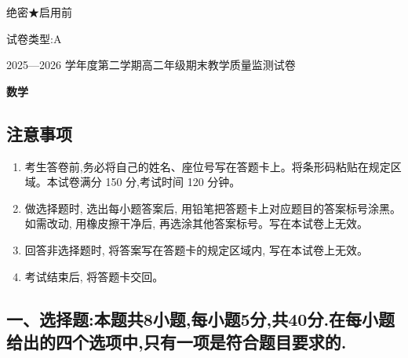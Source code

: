 \documentclass[UTF8,11pt,a4paper]{ctexart}
\newcommand{\ExamMainTitle}[1]{%
  \begin{center}
    {\heiti\bfseries\fontsize{16pt}{23pt}\selectfont #1\par}
  \end{center}
  \vspace{0.15em}%
}
\begin{document}
\color{ExamInk}


绝密★启用前

试卷类型:A

2025---2026 学年度第二学期高二年级期末教学质量监测试卷

\ExamMainTitle{数学}

\subsection{注意事项}\label{ux6ce8ux610fux4e8bux9879}

\begin{enumerate}
\def\labelenumi{\arabic{enumi}.}
\item
  考生答卷前,务必将自己的姓名、座位号写在答题卡上。将条形码粘贴在规定区域。本试卷满分 150 分,考试时间 120 分钟。
\item
  做选择题时, 选出每小题答案后, 用铅笔把答题卡上对应题目的答案标号涂黑。如需改动, 用橡皮擦干净后, 再选涂其他答案标号。写在本试卷上无效。
\item
  回答非选择题时, 将答案写在答题卡的规定区域内, 写在本试卷上无效。
\item
  考试结束后, 将答题卡交回。
\end{enumerate}

\subsection{一、选择题:本题共8小题,每小题5分,共40分.在每小题给出的四个选项中,只有一项是符合题目要求的.}\label{ux4e00ux9009ux62e9ux9898ux672cux9898ux51718ux5c0fux9898ux6bcfux5c0fux98985ux5206ux517140ux5206.ux5728ux6bcfux5c0fux9898ux7ed9ux51faux7684ux56dbux4e2aux9009ux9879ux4e2dux53eaux6709ux4e00ux9879ux662fux7b26ux5408ux9898ux76eeux8981ux6c42ux7684.}
\end{document}
